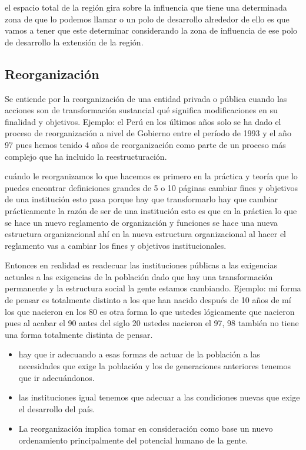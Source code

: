 \documentclass[
  jou,
  floatsintext,
  longtable,
  a4paper,
  nolmodern,
  notxfonts,
  notimes,
  12pt,
  colorlinks=true,linkcolor=blue,citecolor=blue,urlcolor=blue]{apa7}
\providecommand{\tightlist}{%
  \setlength{\itemsep}{0pt}\setlength{\parskip}{0pt}}
\begin{document}
el espacio total de la región gira sobre la influencia que tiene una
determinada zona de que lo podemos llamar o un polo de desarrollo
alrededor de ello es que vamos a tener que este determinar considerando
la zona de influencia de ese polo de desarrollo la extensión de la
región.

\subsection{Reorganización}\label{reorganizaciuxf3n}

Se entiende por la reorganización de una entidad privada o pública
cuando las acciones son de transformación sustancial qué significa
modificaciones en su finalidad y objetivos. Ejemplo: el Perú en los
últimos años solo se ha dado el proceso de reorganización a nivel de
Gobierno entre el período de 1993 y el año 97 pues hemos tenido 4 años
de reorganización como parte de un proceso más complejo que ha incluido
la reestructuración.

cuándo le reorganizamos lo que hacemos es primero en la práctica y
teoría que lo puedes encontrar definiciones grandes de 5 o 10 páginas
cambiar fines y objetivos de una institución esto pasa porque hay que
transformarlo hay que cambiar prácticamente la razón de ser de una
institución esto es que en la práctica lo que se hace un nuevo
reglamento de organización y funciones se hace una nueva estructura
organizacional ahí en la nueva estructura organizacional al hacer el
reglamento vas a cambiar los fines y objetivos institucionales.

Entonces en realidad es readecuar las instituciones públicas a las
exigencias actuales a las exigencias de la población dado que hay una
transformación permanente y la estructura social la gente estamos
cambiando. Ejemplo: mi forma de pensar es totalmente distinto a los que
han nacido después de 10 años de mí los que nacieron en los 80 es otra
forma lo que ustedes lógicamente que nacieron pues al acabar el 90 antes
del siglo 20 ustedes nacieron el 97, 98 también no tiene una forma
totalmente distinta de pensar.

\begin{itemize}
\tightlist
\item
  hay que ir adecuando a esas formas de actuar de la población a las
  necesidades que exige la población y los de generaciones anteriores
  tenemos que ir adecuándonos.
\item
  las instituciones igual tenemos que adecuar a las condiciones nuevas
  que exige el desarrollo del país.
\item
  La reorganización implica tomar en consideración como base un nuevo
  ordenamiento principalmente del potencial humano de la gente.
\end{itemize}
\end{document}

